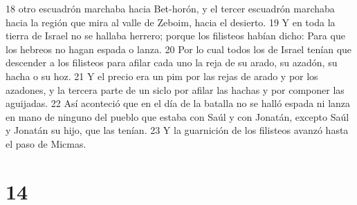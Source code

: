 18 otro escuadrón marchaba hacia Bet-horón, y el tercer escuadrón marchaba hacia la región que mira al valle de Zeboim, hacia el desierto.
19 Y en toda la tierra de Israel no se hallaba herrero; porque los filisteos habían dicho: Para que los hebreos no hagan espada o lanza.
20 Por lo cual todos los de Israel tenían que descender a los filisteos para afilar cada uno la reja de su arado, su azadón, su hacha o su hoz.
21 Y el precio era un pim por las rejas de arado y por los azadones, y la tercera parte de un siclo   por afilar las hachas y por componer las aguijadas.
22 Así aconteció que en el día de la batalla no se halló espada ni lanza en mano de ninguno del pueblo que estaba con Saúl y con Jonatán, excepto Saúl y Jonatán su hijo, que las tenían.
23 Y la guarnición de los filisteos avanzó hasta el paso de Micmas.

\chapter{14}

